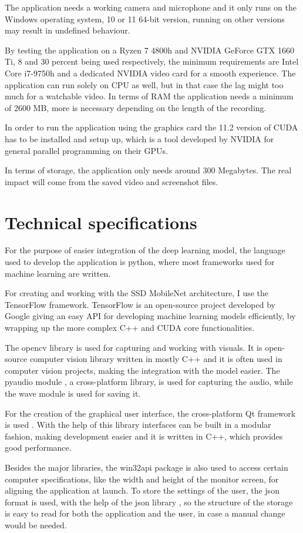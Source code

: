 \par The application needs a working camera and microphone and it only runs on the Windows operating system, 10 or 11 64-bit version, running on other versions may result in undefined behaviour.
\par By testing the application on a Ryzen 7 4800h and NVIDIA GeForce GTX 1660 Ti, 8 and 30 percent being used respectively, the minimum requirements are Intel Core i7-9750h and a dedicated NVIDIA video card for a smooth experience. The application can run solely on CPU as well, but in that case the lag might too much for a watchable video. In terms of RAM the application needs a minimum of 2600 MB, more is necessary depending on the length of the recording.
\par In order to run the application using the graphics card the 11.2 version of CUDA has to be installed and setup up, which is a tool developed by NVIDIA for general parallel programming on their GPUs.
\par In terms of storage, the application only needs around 300 Megabytes. The real impact will come from the saved video and screenshot files.

\label{sec:specssec2}

\section{Technical specifications}
\label{sec:specssec2}

\par For the purpose of easier integration of the deep learning model, the language used to develop the application is python, where most frameworks used for machine learning are written.
\par For creating and working with the SSD MobileNet architecture, I use the TensorFlow \cite{tensorflow2015-whitepaper} framework. TensorFlow is an open-source project developed by Google giving an easy API for developing machine learning models efficiently, by wrapping up the more complex C++ and CUDA core functionalities.
\par The opencv library \cite{opencv_library} is used for capturing and working with visuals. It is open-source computer vision library written in mostly C++ and it is often used in computer vision projects, making the integration with the model easier. The pyaudio module \cite{pyaudio}, a cross-platform library, is used for capturing the audio, while the wave module \cite{wave} is used for saving it.  
\par For the creation of the graphical user interface, the cross-platform Qt framework is used \cite{QtPage}. With the help of this library interfaces can be built in a modular fashion, making development easier and it is written in C++, which provides good performance.
\par Besides the major libraries, the win32api package \cite{win32api} is also used to access certain computer specifications, like the width and height of the monitor screen, for aligning the application at launch. To store the settings of the user, the json format is used, with the help of the json library \cite{jsonlib}, so the structure of the storage is easy to read for both the application and the user, in case a manual change would be needed.